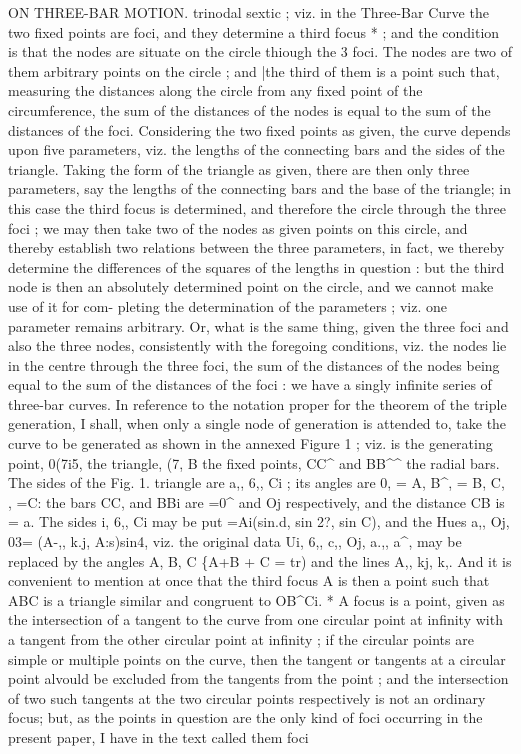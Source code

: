 \documentclass[11pt,a4paper]{book}
\begin{document}
ON THREE-BAR MOTION.
trinodal
sextic
;
viz.
in
the
Three-Bar
Curve
the
two
fixed
points
are
foci,
and
they
determine
a
third
focus *
;
and
the condition
is that the nodes
are situate on the
circle
thiough
the 3
foci.
The
nodes
are
two
of them arbitrary points on
the
circle
;
and |the
third
of them
is
a
point
such
that,
measuring
the
distances
along
the
circle
from
any
fixed
point
of
the
circumference,
the sum
of
the
distances
of
the
nodes
is
equal
to
the sum
of
the
distances
of
the
foci.
Considering
the
two
fixed
points
as
given,
the
curve
depends
upon
five
parameters,
viz. the
lengths
of
the
connecting
bars and the
sides of
the
triangle.
Taking
the form
of
the
triangle
as
given,
there
are
then
only
three
parameters,
say
the
lengths
of
the
connecting
bars
and
the
base
of
the
triangle;
in
this
case
the
third
focus
is
determined,
and
therefore
the
circle
through
the
three
foci
; we may
then
take two
of
the
nodes
as
given
points
on
this
circle, and thereby
establish
two
relations
between
the
three
parameters,
in
fact,
we
thereby
determine
the
differences
of the
squares
of
the
lengths
in
question
:
but
the
third
node
is then
an
absolutely determined
point
on
the
circle,
and we
cannot
make
use
of
it
for com-
pleting
the determination
of
the parameters
;
viz. one parameter remains
arbitrary.
Or,
what
is
the
same
thing,
given
the
three
foci
and
also
the
three
nodes,
consistently
with
the
foregoing
conditions,
viz. the
nodes
lie
in
the
centre
through
the
three
foci,
the sum
of
the
distances
of
the
nodes
being
equal
to
the sum
of
the
distances
of
the
foci
:
we have a
singly
infinite
series
of three-bar curves.
In
reference
to
the
notation
proper
for
the
theorem
of
the
triple
generation,
I
shall, when
only
a
single
node
of
generation
is
attended
to,
take
the
curve
to
be
generated
as
shown
in
the
annexed
Figure
1
;
viz.
is
the
generating
point,
0(7i5,
the
triangle,
(7, B
the
fixed
points,
CC\textasciicircum{}
and
BB\textasciicircum{}\textasciicircum{}
the
radial
bars.
The
sides
of the
Fig.
1.
triangle
are
a,,
6,,
Ci
;
its
angles
are
0, = A, B\textasciicircum{}, = B,
C,
, =C:
the
bars CC, and BBi
are
=0\textasciicircum{} and
Oj
respectively, and
the
distance CB
is = a.
The
sides
\guillemotleft{}i,
6,,
Ci may
be
put =Ai(sin.d,
sin 2?,
sin C), and the
Hues
a,,
Oj, 03= (A-,,
k.j,
A:s)sin4,
viz.
the
original
data
Ui,
6,,
c,,
Oj,
a.,,
a\textasciicircum{}, may
be
replaced
by the
angles
A, B, C \{A+B + C = tr) and
the
lines
A,,
kj,
k,.
And
it
is
convenient
to
mention
at
once
that
the
third
focus
A
is then a point such
that ABC
is a
triangle
similar and congruent
to OB\textasciicircum{}Ci.
* A focus
is a point, given as the
intersection
of a tangent to the curve from one circular point at
infinity
with a tangent from the
other circular point at
infinity
;
if the circular points
are simple or multiple points on
the
curve, then
the
tangent
or
tangents
at
a
circular
point
alvould
be excluded
from
the
tangents from
the
point
;
and
the
intersection
of two
such
tangents
at
the
two
circular points
respectively
is not
an
ordinary
focus;
but, as the
points
in
question
are
the
only kind
of
foci
occurring
in
the present paper,
I have in the
text called them foci
\end{document}
